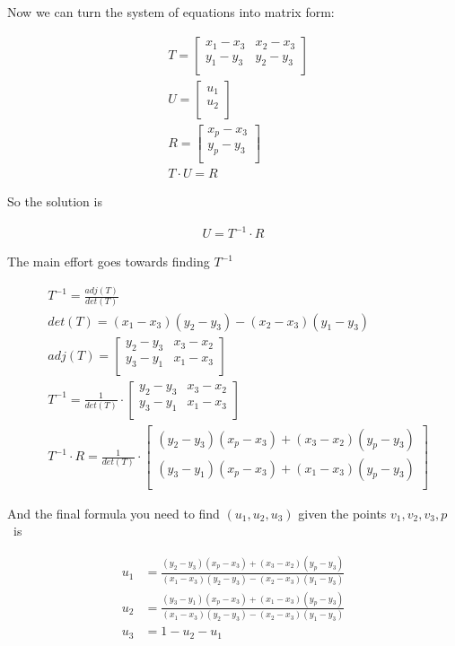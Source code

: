 \documentclass{article}
\begin{document}
Now we can turn the system of equations into matrix form:

\begin{align}
  & T =
  \begin{bmatrix}
    x_1 - x_3 & x_2 - x_3 \\
    y_1 - y_3 & y_2 - y_3 \\
  \end{bmatrix} \\
  & U = \begin{bmatrix}
    u_1 \\ u_2 \\
  \end{bmatrix}\\
  & R = \begin{bmatrix}
    x_p - x_3 \\
    y_p - y_3 \\
  \end{bmatrix} \\
  & T \cdot U = R
\end{align}

So the solution is

\begin{align}
  U = T^{-1} \cdot R
\end{align}

The main effort goes towards finding $T^{-1}$

\begin{align}
  & T^{-1} = \frac{adj(T)}{det(T)} \\
  & det(T) = (x_1 - x_3)(y_2 - y_3) - (x_2 - x_3)(y_1 - y_3) \\
  & adj(T) = \begin{bmatrix}
    y_2 - y_3 & x_3 - x_2 \\
    y_3 - y_1 & x_1 - x_3 \\
  \end{bmatrix} \\
  & T^{-1} = \frac{1}{det(T)} \cdot \begin{bmatrix}
    y_2 - y_3 & x_3 - x_2 \\
    y_3 - y_1 & x_1 - x_3 \\
  \end{bmatrix} \\
  & T^{-1}\cdot R = \frac{1}{det(T)} \cdot \begin{bmatrix}
    (y_2 - y_3)(x_p - x_3) + (x_3 - x_2)(y_p - y_3) \\
    (y_3 - y_1)(x_p - x_3) + (x_1 - x_3)(y_p - y_3) \\
  \end{bmatrix}
\end{align}

And the final formula you need to find $(u_1, u_2, u_3)$ given the points $v_1, v_2, v_3, p$~is

\begin{align}
  u_1 &= \frac{(y_2 - y_3)(x_p - x_3) + (x_3 - x_2)(y_p - y_3)}{(x_1 - x_3)(y_2 - y_3) - (x_2 - x_3)(y_1 - y_3)} \\
  u_2 &= \frac{(y_3 - y_1)(x_p - x_3) + (x_1 - x_3)(y_p - y_3)}{(x_1 - x_3)(y_2 - y_3) - (x_2 - x_3)(y_1 - y_3)} \\
  u_3 &= 1 - u_2 - u_1
\end{align}
\end{document}
